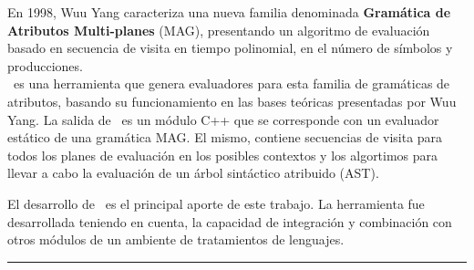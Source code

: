 \documentclass[a4paper,11pt]{ThesisStyle}
\begin{document}
\begin{vcenterpage}
En 1998, Wuu Yang caracteriza una nueva familia denominada \textbf{Gramática de Atributos Multi-planes} (MAG), presentando un algoritmo de evaluación basado en secuencia de visita en tiempo polinomial, en el número de símbolos y producciones.\\ 

\maggen\ es una herramienta que genera evaluadores para esta familia de gramáticas de atributos, basando su funcionamiento en las bases teóricas presentadas por Wuu Yang. La salida de \maggen\ es un módulo C++ que se corresponde con un evaluador estático de una gramática MAG. El mismo, contiene secuencias de visita para todos los planes de evaluación en los posibles contextos y los algortimos para llevar a cabo la evaluación de un árbol sintáctico atribuido (AST).

El desarrollo de \maggen\ es el principal aporte de este trabajo. La herramienta fue desarrollada teniendo en cuenta, la capacidad de integración y combinación con otros módulos de un ambiente de tratamientos de lenguajes.

% 

\noindent\rule[2pt]{\textwidth}{0.5pt}

\end{vcenterpage}

\tableofcontents

\mainmatter

\appendix
\addappheadtotoc
\appendixpage


\listoffigures

\listoftables

\listofalgorithms
{}

% 
% 



\end{document}
